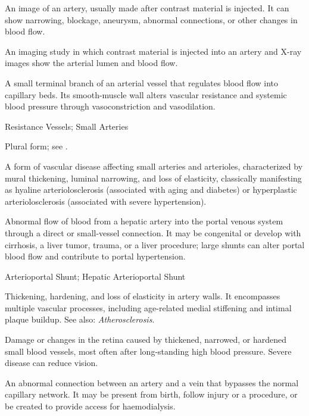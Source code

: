  An image of an artery, usually made after contrast material is injected. It can show narrowing, blockage, aneurysm, abnormal connections, or other changes in blood flow.

 An imaging study in which contrast material is injected into an artery and X-ray images show the arterial lumen and blood flow.

 A small terminal branch of an arterial vessel that regulates blood flow into capillary beds. Its smooth-muscle wall alters vascular resistance and systemic blood pressure through vasoconstriction and vasodilation.

\synonyms
Resistance Vessels; Small Arteries

 Plural form; see .

 A form of vascular disease affecting small arteries and arterioles, characterized by mural thickening, luminal narrowing, and loss of elasticity, classically manifesting as hyaline arteriolosclerosis (associated with aging and diabetes) or hyperplastic arteriolosclerosis (associated with severe hypertension).

 Abnormal flow of blood from a hepatic artery into the portal venous system through a direct or small-vessel connection. It may be congenital or develop with cirrhosis, a liver tumor, trauma, or a liver procedure; large shunts can alter portal blood flow and contribute to portal hypertension.

\synonyms
Arterioportal Shunt; Hepatic Arterioportal Shunt

 Thickening, hardening, and loss of elasticity in artery walls. It encompasses multiple vascular processes, including age-related medial stiffening and intimal plaque buildup. See also: \textit{Atherosclerosis}.

 Damage or changes in the retina caused by thickened, narrowed, or hardened small blood vessels, most often after long-standing high blood pressure. Severe disease can reduce vision.

 An abnormal connection between an artery and a vein that bypasses the normal capillary network. It may be present from birth, follow injury or a procedure, or be created to provide access for haemodialysis.

